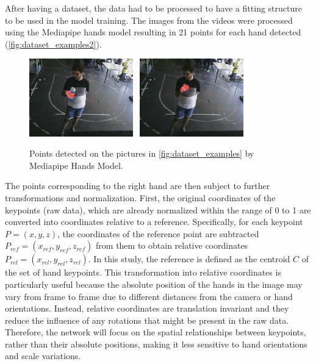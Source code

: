 After having a dataset, the data had to be processed to have a fitting structure to be used in the model training. The images from the videos were processed using the Mediapipe hands model resulting in 21 points for each hand detected (\autoref{fig:dataset_examples2}).

\begin{figure}[ht]
    \centerline{\includegraphics[width=0.4\textwidth]{figs/dataset_preprocessing2_1.png} \ \includegraphics[width=0.4\textwidth]{figs/dataset_preprocessing2_2.png}}
    \caption{Points detected on the pictures in \autoref{fig:dataset_examples} by Mediapipe Hands Model.}
    \label{fig:dataset_examples2}
\end{figure}

The points corresponding to the right hand are then subject to further transformations and normalization. First, the original coordinates of the keypoints (raw data), which are already normalized within the range of 0 to 1 are converted into coordinates relative to a reference. Specifically, for each keypoint $P = (x,y,z)$, the coordinates of the reference point are subtracted $P_{ref} = (x_{ref}, y_{ref}, z_{ref})$ from them to obtain relative coordinates $P_{rel} = (x_{rel}, y_{rel}, z_{rel})$. In this study, the reference is defined as the centroid $C$ of the set of hand keypoints.
This transformation into relative coordinates is particularly useful because the absolute position of the hands in the image may vary from frame to frame due to different distances from the camera or hand orientations. Instead, relative coordinates are translation invariant and they reduce the influence of any rotations that might be present in the raw data. Therefore, the network will focus on the spatial relationships between keypoints, rather than their absolute positions, making it less sensitive to hand orientations and scale variations.

